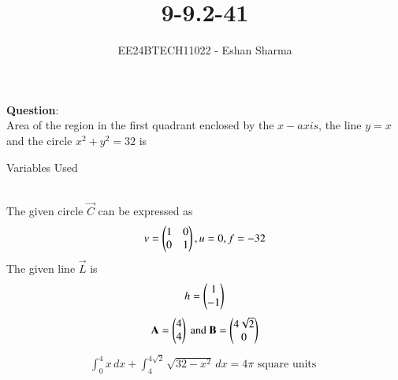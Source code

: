 \documentclass[journal]{IEEEtran}
\begin{document}

\vspace{3cm}

\title{9-9.2-41}
\author{EE24BTECH11022 - Eshan Sharma}
{\let\newpage\relax\maketitle}

\renewcommand{\thefigure}{\theenumi}
\renewcommand{\thetable}{\theenumi}
\setlength{\intextsep}{10pt} %


\renewcommand{\thetable}{\theenumi}

\textbf{Question}:\\
Area of the region in the first quadrant enclosed by the $x-axis$, the line $y = x$ and the circle $x^{2} + y^{2} = 32$ is
\\
\begin{table}[h!]    
  \centering
  
  \caption{Variables Used}
  \label{tab0}
\end{table}
\solution\\
The given circle $\vec{C}$ can be expressed as
\begin{align}
	v = \begin{pmatrix}1&0\\0&1\end{pmatrix}, u = 0, f = -32
\end{align}
The given line $\vec{L}$ is
\begin{align}
	h = \begin{pmatrix}1\\-1\end{pmatrix}
\end{align}
\begin{align}
	\mathbf{A} = \begin{pmatrix}4\\4\end{pmatrix} \text{ and } \mathbf{B} = \begin{pmatrix}4\sqrt{2}\\0\end{pmatrix}
\end{align}
\begin{align}
	\int_{0}^{4} x \, dx + \int_{4}^{4\sqrt{2}} \sqrt{32-x^{2}} \, dx = 4\pi \text{ square units }
\end{align}
\end{document}
